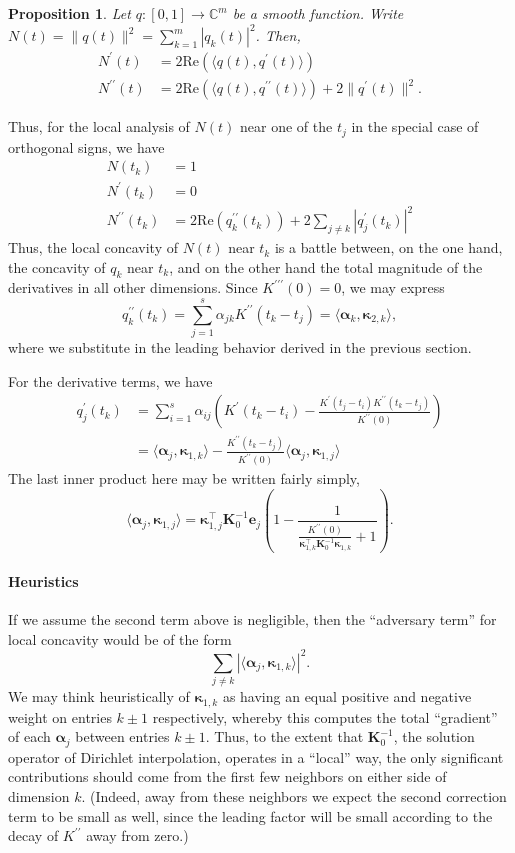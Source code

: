 \documentclass[11pt]{article}
\newcommand{\ra}{\rangle}
\newcommand{\la}{\langle}
\newcommand{\CC}{\mathbb{C}}
\renewcommand{\Re}{\mathrm{Re}}
\newcommand{\balpha}{\bm \alpha}
\newcommand{\bK}{\bm K}
\newcommand{\be}{\bm e}
\newcommand{\bkappa}{\bm \kappa}
\newtheorem{proposition}{Proposition}
\newcounter{para}
\begin{document}
\begin{proposition}
    Let $q: [0, 1] \to \CC^m$ be a smooth function.
    Write $N(t) = \|q(t)\|^2 = \sum_{k = 1}^m |q_k(t)|^2$.
    Then,
    \begin{align}
      N^\prime(t) &= 2\Re(\la q(t), q^\prime(t) \ra) \\
      N^{\prime\prime}(t) &= 2\Re(\la q(t), q^{\prime\prime}(t) \ra) + 2\|q^\prime(t)\|^2.
    \end{align}
\end{proposition}
Thus, for the local analysis of $N(t)$ near one of the $t_j$ in the special case of orthogonal signs, we have
\begin{align}
  N(t_k) &= 1 \\
  N^\prime(t_k) &= 0 \\
  N^{\prime\prime}(t_k) &= 2\Re(q^{\prime\prime}_k(t_k)) + 2\sum_{j \neq k}|q_j^\prime(t_k)|^2
\end{align}
Thus, the local concavity of $N(t)$ near $t_k$ is a battle between, on the one hand, the concavity of $q_k$ near $t_k$, and on the other hand the total magnitude of the derivatives in all other dimensions.
Since $K^{\prime\prime\prime}(0) = 0$, we may express
\[ q^{\prime\prime}_k(t_k) = \sum_{j = 1}^s \alpha_{jk}K^{\prime\prime}(t_k - t_j) = \la \balpha_k, \bkappa_{2, k} \ra, \]
where we substitute in the leading behavior derived in the previous section.

For the derivative terms, we have
\begin{align}
  q^\prime_j(t_k)
  &= \sum_{i = 1}^s\alpha_{ij}\left(K^\prime(t_k - t_i) - \frac{K^\prime(t_j - t_i)K^{\prime\prime}(t_k - t_j)}{K^{\prime\prime}(0)}\right) \\
  &= \la \balpha_j, \bkappa_{1, k} \ra - \frac{K^{\prime\prime}(t_k - t_j)}{K^{\prime\prime}(0)} \la \balpha_j, \bkappa_{1, j} \ra
\end{align}
The last inner product here may be written fairly simply,
\[ \la \balpha_j, \bkappa_{1, j} \ra = \bkappa_{1, j}^\top \bK_0^{-1} \be_j\left(1 - \frac{1}{\frac{K^{\prime\prime}(0)}{\bkappa_{1, k}^\top \bK_0^{-1}\bkappa_{1, k}} + 1}\right). \]

\paragraph{Heuristics}
If we assume the second term above is negligible, then the ``adversary term'' for local concavity would be of the form
\[ \sum_{j \neq k} |\la \balpha_j, \bkappa_{1, k} \ra|^2. \]
We may think heuristically of $\bkappa_{1, k}$ as having an equal positive and negative weight on entries $k \pm 1$ respectively, whereby this computes the total ``gradient'' of each $\balpha_j$ between entries $k \pm 1$.
Thus, to the extent that $\bK_0^{-1}$, the solution operator of Dirichlet interpolation, operates in a ``local'' way, the only significant contributions should come from the first few neighbors on either side of dimension $k$.
(Indeed, away from these neighbors we expect the second correction term to be small as well, since the leading factor will be small according to the decay of $K^{\prime\prime}$ away from zero.)
\end{document}
